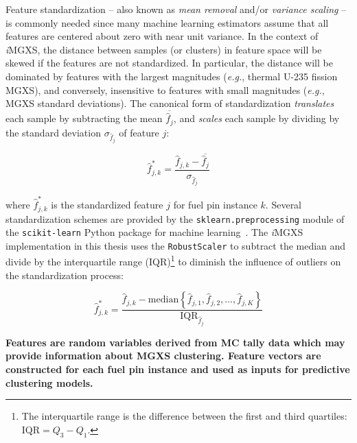Feature standardization -- also known as \textit{mean removal} and/or \textit{variance scaling} -- is commonly needed since many machine learning estimators assume that all features are centered about zero with near unit variance. In the context of \textit{i}\ac{MGXS}, the distance between samples (or clusters) in feature space will be skewed if the features are not standardized. In particular, the distance will be dominated by features with the largest magnitudes (\textit{e.g.}, thermal U-235 fission \ac{MGXS}), and conversely, insensitive to features with small magnitudes (\textit{e.g.}, \ac{MGXS} standard deviations). The canonical form of standardization \textit{translates} each sample by subtracting the mean $\overline{\hat{f}_{j}}$, and \textit{scales} each sample by dividing by the standard deviation $\sigma_{\hat{f}_{j}}$ of feature $j$:

\begin{equation}
\label{eqn:chap10-standard-standardize}
\hat{f}_{j,k}^{*} = \frac{\hat{f}_{j,k} - \overline{\hat{f}_{j}}}{\sigma_{\hat{f}_{j}}}
\end{equation}

\noindent where $\hat{f}_{j,k}^{*}$ is the standardized feature $j$ for fuel pin instance $k$. Several standardization schemes are provided by the \texttt{sklearn.preprocessing} module of the \texttt{scikit-learn} Python package for machine learning~\cite{pedregosa2011sklearn}. The \textit{i}\ac{MGXS} implementation in this thesis uses the \texttt{RobustScaler} to subtract the median and divide by the interquartile range (IQR)\footnote{The interquartile range is the difference between the first and third quartiles: $\mathrm{IQR} = Q_{3} - Q_{1}$.} to diminish the influence of outliers on the standardization process:

\begin{equation}
\label{eqn:chap10-robust-standardize}
\hat{f}_{j,k}^{*} = \frac{\hat{f}_{j,k} - \mathrm{median}\left\{\hat{f}_{j,1}, \hat{f}_{j,2}, \dots, \hat{f}_{j,K}\right\}}{\mathrm{IQR}_{\hat{f}_{j}}}
\end{equation}

\begin{emphbox}
\textbf{Features are random variables derived from \ac{MC} tally data which may provide information about \ac{MGXS} clustering. Feature vectors are constructed for each fuel pin instance and used as inputs for predictive clustering models.}
\end{emphbox}


